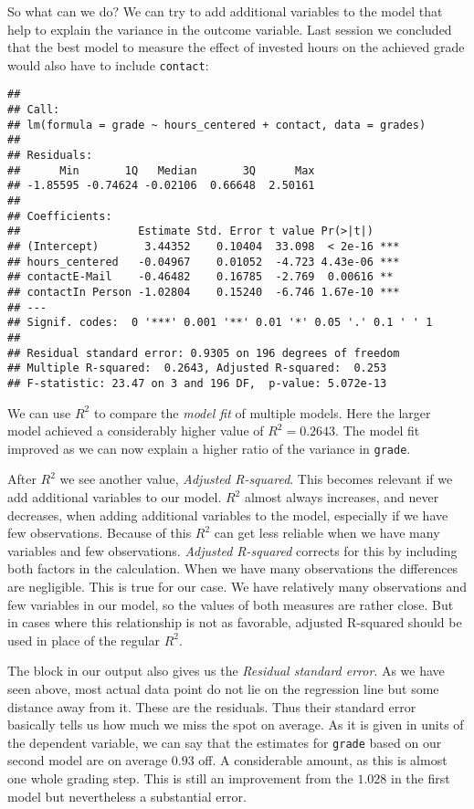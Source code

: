 \documentclass[
]{book}
\begin{document}
So what can we do? We can try to add additional variables to the model that help
to explain the variance in the outcome variable. Last session we concluded
that the best model to measure the effect of invested hours on the achieved
grade would also have to include \texttt{contact}:

\begin{verbatim}
## 
## Call:
## lm(formula = grade ~ hours_centered + contact, data = grades)
## 
## Residuals:
##      Min       1Q   Median       3Q      Max 
## -1.85595 -0.74624 -0.02106  0.66648  2.50161 
## 
## Coefficients:
##                  Estimate Std. Error t value Pr(>|t|)    
## (Intercept)       3.44352    0.10404  33.098  < 2e-16 ***
## hours_centered   -0.04967    0.01052  -4.723 4.43e-06 ***
## contactE-Mail    -0.46482    0.16785  -2.769  0.00616 ** 
## contactIn Person -1.02804    0.15240  -6.746 1.67e-10 ***
## ---
## Signif. codes:  0 '***' 0.001 '**' 0.01 '*' 0.05 '.' 0.1 ' ' 1
## 
## Residual standard error: 0.9305 on 196 degrees of freedom
## Multiple R-squared:  0.2643, Adjusted R-squared:  0.253 
## F-statistic: 23.47 on 3 and 196 DF,  p-value: 5.072e-13
\end{verbatim}

We can use \(R^2\) to compare the \emph{model fit} of multiple models. Here the larger
model achieved a considerably higher value of \(R^2 = 0.2643\). The model fit
improved as we can now explain a higher ratio of the variance in \texttt{grade}.

After \(R^2\) we see another value, \emph{Adjusted R-squared}. This becomes relevant
if we add additional variables to our model. \(R^2\) almost always increases, and
never decreases, when adding additional variables to the model,
especially if we have few observations. Because of this \(R^2\) can get less
reliable when we have many variables and few observations. \emph{Adjusted R-squared}
corrects for this by including both factors in the calculation. When we have
many observations the differences are negligible. This is true for our case.
We have relatively many observations and few variables in our model, so the
values of both measures are rather close. But in cases where this relationship
is not as favorable, adjusted R-squared should be used in place of the regular
\(R^2\).

The block in our output also gives us the \emph{Residual standard error}. As we have
seen above, most actual data point do not lie on the regression line but some
distance away from it. These are the residuals. Thus their standard error basically
tells us how much we miss the spot on average. As it is given in units of the
dependent variable, we can say that the estimates for \texttt{grade} based on our
second model are on average \(0.93\) off. A considerable amount, as this is almost
one whole grading step. This is still an improvement from the \(1.028\) in the
first model but nevertheless a substantial error.
\end{document}
